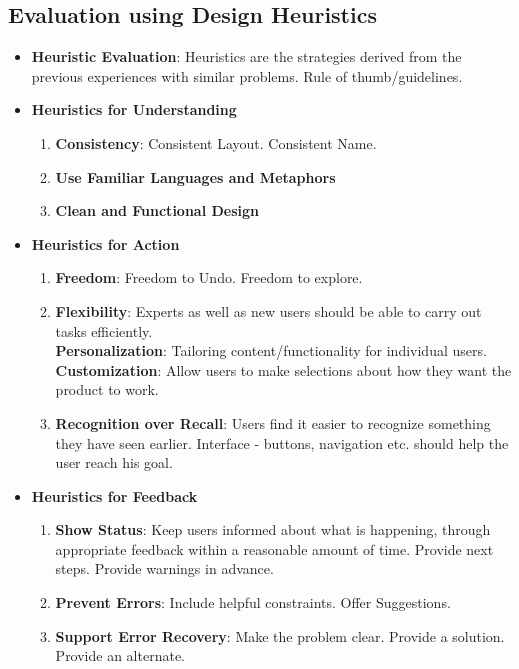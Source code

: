 \documentclass[a4paper]{article}
\begin{document}
\subsection{Evaluation using Design Heuristics}
\begin{itemize}
    \item \textbf{Heuristic Evaluation}: Heuristics are the strategies derived from the previous experiences with similar problems. Rule of thumb/guidelines.
    \item \textbf{Heuristics for Understanding}
    \begin{enumerate}
        \item \textbf{Consistency}: Consistent Layout. Consistent Name.
        \item \textbf{Use Familiar Languages and Metaphors}
        \item \textbf{Clean and Functional Design}
    \end{enumerate}
    \item \textbf{Heuristics for Action}
    \begin{enumerate}
        \item \textbf{Freedom}: Freedom to Undo. Freedom to explore.
        \item \textbf{Flexibility}: Experts as well as new users should be able to carry out tasks efficiently.\\
        \textbf{Personalization}: Tailoring content/functionality for individual users.\\
        \textbf{Customization}: Allow users to make selections about how they want the product to work.
        \item \textbf{Recognition over Recall}: Users find it easier to recognize something they have seen earlier. Interface - buttons, navigation etc. should help the user reach his goal.
    \end{enumerate}
    \item \textbf{Heuristics for Feedback}
    \begin{enumerate}
        \item \textbf{Show Status}: Keep users informed about what is happening, through appropriate feedback within a reasonable amount of time. Provide next steps. Provide warnings in advance.
        \item \textbf{Prevent Errors}: Include helpful constraints. Offer Suggestions.
        \item \textbf{Support Error Recovery}: Make the problem clear. Provide a solution. Provide an alternate.

\end{enumerate}
\end{itemize}
\end{document}
